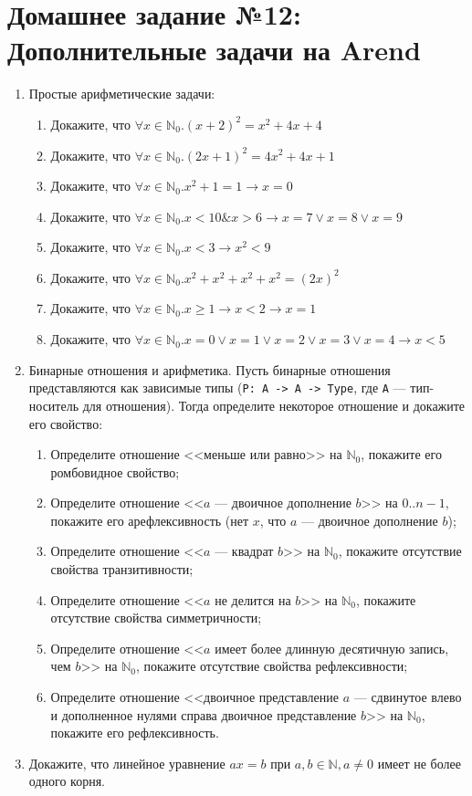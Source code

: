 \documentclass[10pt,a4paper,oneside]{article}
\begin{document}
\section*{Домашнее задание №12: Дополнительные задачи на Arend}
\begin{enumerate}
\item Простые арифметические задачи:
\begin{enumerate}
\item Докажите, что $\forall x\in\mathbb{N}_0.(x+2)^2 = x^2 + 4x + 4$
\item Докажите, что $\forall x\in\mathbb{N}_0.(2x+1)^2 = 4x^2 + 4x + 1$
\item Докажите, что $\forall x\in\mathbb{N}_0.x^2 + 1 = 1 \rightarrow x = 0$
\item Докажите, что $\forall x\in\mathbb{N}_0.x < 10 \& x > 6 \rightarrow x = 7 \vee x=8 \vee x=9$
\item Докажите, что $\forall x\in\mathbb{N}_0.x < 3 \rightarrow x^2 < 9$
\item Докажите, что $\forall x\in\mathbb{N}_0.x^2 + x^2 + x^2 + x^2 = (2x)^2$
\item Докажите, что $\forall x\in\mathbb{N}_0.x \ge 1 \rightarrow x < 2 \rightarrow x = 1$
\item Докажите, что $\forall x\in\mathbb{N}_0.x = 0 \vee x = 1 \vee x = 2 \vee x=3 \vee x=4 \rightarrow x < 5$
\end{enumerate}

\item Бинарные отношения и арифметика. Пусть бинарные отношения представляются как зависимые типы (\verb!P: A -> A -> Type!,
где \verb!A! --- тип-носитель для отношения).
Тогда определите некоторое отношение и докажите его свойство:
\begin{enumerate}
\item Определите отношение <<меньше или равно>> на $\mathbb{N}_0$, покажите его ромбовидное свойство;
\item Определите отношение <<$a$ --- двоичное дополнение $b$>> на $0..n-1$, покажите его арефлексивность (нет $x$, что $a$ ---
двоичное дополнение $b$);
\item Определите отношение <<$a$ --- квадрат $b$>> на $\mathbb{N}_0$, покажите отсутствие свойства транзитивности;
\item Определите отношение <<$a$ не делится на $b$>> на $\mathbb{N}_0$, покажите отсутствие свойства симметричности;
\item Определите отношение <<$a$ имеет более длинную десятичную запись, чем $b$>> на $\mathbb{N}_0$, покажите отсутствие свойства рефлексивности;
\item Определите отношение <<двоичное представление $a$ --- сдвинутое влево и дополненное нулями справа двоичное представление $b$>> 
на $\mathbb{N}_0$, покажите его рефлексивность.
\end{enumerate}

\item Докажите, что линейное уравнение $ax = b$ при $a,b \in \mathbb{N}, a \ne 0$ имеет не более одного корня.
\end{enumerate}
\end{document}
